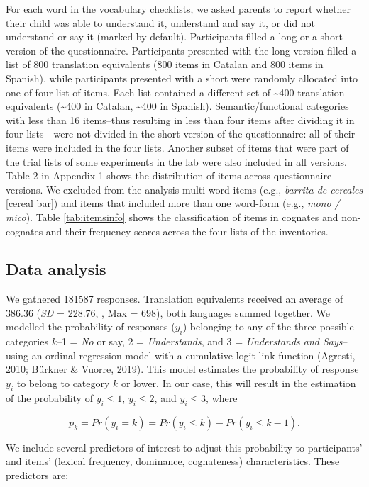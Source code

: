 \documentclass[
  english,
  man,man,floatsintext]{apa6}
\begin{document}
For each word in the vocabulary checklists, we asked parents to report whether their child was able to understand it, understand and say it, or did not understand or say it (marked by default). Participants filled a long or a short version of the questionnaire. Participants presented with the long version filled a list of 800 translation equivalents (800 items in Catalan and 800 items in Spanish), while participants presented with a short were randomly allocated into one of four list of items. Each list contained a different set of \textasciitilde400 translation equivalents (\textasciitilde400 in Catalan, \textasciitilde400 in Spanish). Semantic/functional categories with less than 16 items--thus resulting in less than four items after dividing it in four lists - were not divided in the short version of the questionnaire: all of their items were included in the four lists. Another subset of items that were part of the trial lists of some experiments in the lab were also included in all versions. Table 2 in Appendix 1 shows the distribution of items across questionnaire versions. We excluded from the analysis multi-word items (e.g., \emph{barrita de cereales} {[}cereal bar{]}) and items that included more than one word-form (e.g., \emph{mono / mico}). Table \ref{tab:itemsinfo} shows the classification of items in cognates and non-cognates and their frequency scores across the four lists of the inventories.

\hypertarget{data-analysis}{%
\subsection{Data analysis}\label{data-analysis}}

We gathered 181587 responses. Translation equivalents received an average of 386.36 (\emph{SD} = 228.76, , Max = 698), both languages summed together. We modelled the probability of responses (\(y_i\)) belonging to any of the three possible categories \(k\)--1 = \emph{No} or say, 2 = \emph{Understands}, and 3 = \emph{Understands and Says}-- using an ordinal regression model with a cumulative logit link function (Agresti, 2010; Bürkner \& Vuorre, 2019). This model estimates the probability of response \(y_i\) to belong to category \(k\) or lower. In our case, this will result in the estimation of the probability of \(y_i \leq 1\), \(y_i \leq 2\), and \(y_i \leq 3\), where

\[
p_k = Pr(y_i = k) = Pr(y_i \leq k) - Pr(y_i \leq k-1).
\]

We include several predictors of interest to adjust this probability to participants' and items' (lexical frequency, dominance, cognateness) characteristics. These predictors are:
\end{document}
